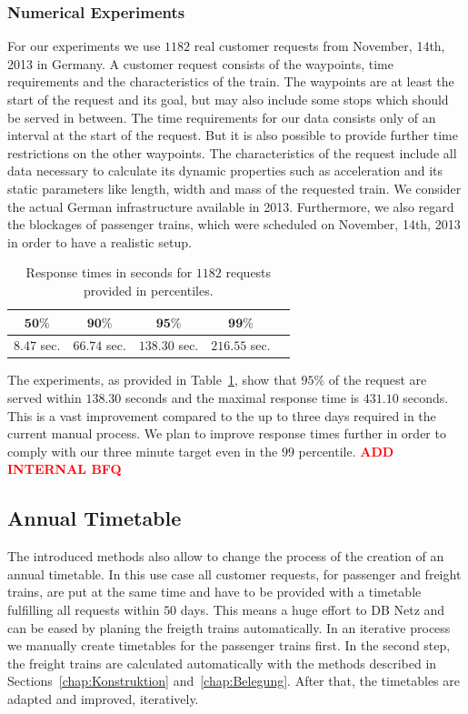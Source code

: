 \subsubsection{Numerical Experiments}
For our experiments we use $1182$ real customer requests from November, 14th, 2013 in Germany. A customer request consists of the waypoints, time requirements and the characteristics of the train. The waypoints are at least the start of the request and its goal, but may also include some stops which should be served in between. The time requirements for our data consists only of an interval at the start of the request. But it is also possible to provide further time restrictions on the other waypoints. The characteristics of the request include all data necessary to calculate its dynamic properties such as acceleration and its static parameters like length, width and mass of the requested train. We consider the actual German infrastructure available in 2013. Furthermore, we also regard the blockages of passenger trains, which were scheduled on November, 14th, 2013 in order to have a realistic setup.
%
\begin{table}[h]
	\centering
	\caption{Response times in seconds for $1182$ requests provided in percentiles.}
	\label{tab:result_CnR}
	\begin{tabular}{ccccc} \hline
		$\textbf{50\%}$ & $\textbf{90\%}$ & $\textbf{95\%}$ & $\textbf{99\%}$ \\ \hline
		$8.47$ sec.     & $66.74$ sec.    & $138.30$ sec.   & $216.55$ sec.   \\
	\end{tabular}
\end{table}
\par

The experiments, as provided in Table~\ref{tab:result_CnR}, show that $95\%$ of the request are served within $138.30$ seconds and the maximal response time is $431.10$ seconds. This is a vast improvement compared to the up to three days required in the current manual process. We plan to improve response times further in order to comply with our three minute target even in the $99$ percentile.
\textbf{\textcolor{red}{ADD INTERNAL BFQ}}

\subsection{Annual Timetable}
\label{chap:Netzfahrplan}

The introduced methods also allow to change the process of the creation of an annual timetable. In this use case all customer requests, for passenger and freight trains, are put at the same time and have to be provided with a timetable fulfilling all requests within $50$ days. This means a huge effort to DB Netz and can be eased by planing the freigth trains automatically. In an iterative process we manually create timetables for the passenger trains first. In the second step, the freight trains are calculated automatically with the methods described in Sections~\ref{chap:Konstruktion} and~\ref{chap:Belegung}. After that, the timetables are adapted and improved, iteratively.

